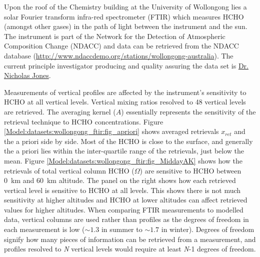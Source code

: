       Upon the roof of the Chemistry building at the University of Wollongong lies a solar Fourier transform infra-red spectrometer (FTIR) which measures HCHO (amongst other gases) in the path of light between the instrument and the sun.
      The instrument is part of the Network for the Detection of Atmospheric Composition Change (NDACC) and data can be retrieved from the NDACC database (\url{http://www.ndaccdemo.org/stations/wollongong-australia}).
      The current principle investigator producing and quality assuring the data set is \href{mailto:njones@uow.edu.au}{Dr. Nicholas Jones}.
      
      Measurements of vertical profiles are affected by the instrument's sensitivity to HCHO at all vertical levels.
      Vertical mixing ratios resolved to 48 vertical levels are retrieved. %
      The averaging kernel ($A$) essentially represents the sensitivity of the retrieval technique to HCHO concentrations.
      Figure \ref{Model:datasets:wollongong_ftir:fig_apriori} shows averaged retrievals $x_{ret}$ and the a priori side by side.
      Most of the HCHO is close to the surface, and generally the a priori lies within the inter-quartile range of the retrievals, just below the mean.
      Figure \ref{Model:datasets:wollongong_ftir:fig_MiddayAK} shows how the retrievals of total vertical column HCHO ($\Omega$) are sensitive to HCHO between 0~km and 60~km altitude.
      The panel on the right shows how each retrieved vertical level is sensitive to HCHO at all levels.
      This shows there is not much sensitivity at higher altitudes and HCHO at lower altitudes can affect retrieved values for higher altitudes.
      When comparing FTIR measurements to modelled data, vertical columns are used rather than profiles as the degrees of freedom in each measurement is low ($\sim 1.3$ in summer to $\sim 1.7$ in winter).
      Degrees of freedom signify how many pieces of information can be retrieved from a measurement, and profiles resolved to \textit{N} vertical levels would require at least \textit{N}-1 degrees of freedom.
      
      
